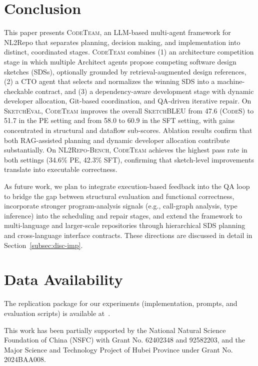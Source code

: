 \documentclass[format=acmsmall, review=false, screen=true]{acmart}
\newcommand{\tool}{\textsc{CodeTeam}\xspace}
\newcommand{\codes}{\textsc{CodeS}\xspace}
\newcommand{\sketcheval}{\textsc{SketchEval}\xspace}
\newcommand{\sketchbleu}{\textsc{SketchBLEU}\xspace}
\newcommand{\nlrepobench}{\textsc{NL2Repo-Bench}\xspace}
\begin{document}
\section{Conclusion}\label{sec:conclusion}
This paper presents \tool, an LLM-based multi-agent framework for NL2Repo that separates planning, decision making, and implementation into distinct, coordinated stages.
\tool combines (1) an architecture competition stage in which multiple Architect agents propose competing software design sketches (SDSs), optionally grounded by retrieval-augmented design references, (2) a CTO agent that selects and normalizes the winning SDS into a machine-checkable contract, and (3) a dependency-aware development stage with dynamic developer allocation, Git-based coordination, and QA-driven iterative repair.
On \sketcheval, \tool improves the overall \sketchbleu from 47.6 (\codes) to 51.7 in the PE setting and from 58.0 to 60.9 in the SFT setting, with gains concentrated in structural and dataflow sub-scores.
Ablation results confirm that both RAG-assisted planning and dynamic developer allocation contribute substantially.
On \nlrepobench, \tool achieves the highest pass rate in both settings (34.6\% PE, 42.3\% SFT), confirming that sketch-level improvements translate into executable correctness.

As future work, we plan to integrate execution-based feedback into the QA loop to bridge the gap between structural evaluation and functional correctness, incorporate stronger program-analysis signals (e.g., call-graph analysis, type inference) into the scheduling and repair stages, and extend the framework to multi-language and larger-scale repositories through hierarchical SDS planning and cross-language interface contracts.
These directions are discussed in detail in Section~\ref{subsec:disc-imp}.

\section*{Data Availability}
The replication package for our experiments (implementation, prompts, and evaluation scripts) is available at~\cite{replpack}.

\begin{acks}
This work has been partially supported by the National Natural Science Foundation of China (NSFC) with Grant No. 62402348 and 92582203, and the Major Science and Technology Project of Hubei Province under Grant No. 2024BAA008. %
\end{acks}



\end{document}
